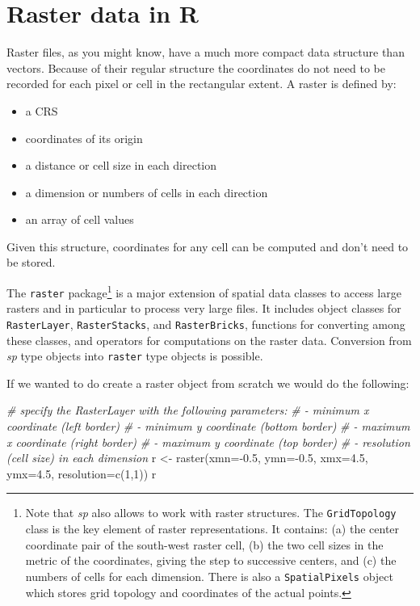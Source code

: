 \documentclass[
  11pt,
]{book}
\newenvironment{Shaded}{\begin{snugshade}}{\end{snugshade}}
\newcommand{\AttributeTok}[1]{\textcolor[rgb]{0.77,0.63,0.00}{#1}}
\newcommand{\CommentTok}[1]{\textcolor[rgb]{0.56,0.35,0.01}{\textit{#1}}}
\newcommand{\DecValTok}[1]{\textcolor[rgb]{0.00,0.00,0.81}{#1}}
\newcommand{\FloatTok}[1]{\textcolor[rgb]{0.00,0.00,0.81}{#1}}
\newcommand{\FunctionTok}[1]{\textcolor[rgb]{0.00,0.00,0.00}{#1}}
\newcommand{\NormalTok}[1]{#1}
\newcommand{\OtherTok}[1]{\textcolor[rgb]{0.56,0.35,0.01}{#1}}
\newcommand{\SpecialCharTok}[1]{\textcolor[rgb]{0.00,0.00,0.00}{#1}}
\providecommand{\tightlist}{%
  \setlength{\itemsep}{0pt}\setlength{\parskip}{0pt}}
\begin{document}
\hypertarget{raster-data-in-r}{%
\section{Raster data in R}\label{raster-data-in-r}}

Raster files, as you might know, have a much more compact data structure than vectors. Because of their regular structure the coordinates do not need to be recorded for each pixel or cell in the rectangular extent. A raster is defined by:

\begin{itemize}
\tightlist
\item
  a CRS
\item
  coordinates of its origin
\item
  a distance or cell size in each direction
\item
  a dimension or numbers of cells in each direction
\item
  an array of cell values
\end{itemize}

Given this structure, coordinates for any cell can be computed and don't need to be stored.

The \texttt{raster} package\footnote{Note that \emph{sp} also allows to work with raster structures. The \texttt{GridTopology} class is the key element of raster representations. It contains: (a) the center coordinate pair of the south-west raster cell, (b) the two cell sizes in the metric of the coordinates, giving the step to successive centers, and (c) the numbers of cells for each dimension. There is also a \texttt{SpatialPixels} object which stores grid topology and coordinates of the actual points.} is a major extension of spatial data classes to access large rasters and in particular to process very large files. It includes object classes for \texttt{RasterLayer}, \texttt{RasterStacks}, and \texttt{RasterBricks}, functions for converting among these classes, and operators for computations on the raster data. Conversion from \emph{sp} type objects into \texttt{raster} type objects is possible.

If we wanted to do create a raster object from scratch we would do the following:

\begin{Shaded}
\begin{Highlighting}[]
\CommentTok{\# specify the RasterLayer with the following parameters:}
\CommentTok{\# {-} minimum x coordinate (left border)}
\CommentTok{\# {-} minimum y coordinate (bottom border)}
\CommentTok{\# {-} maximum x coordinate (right border)}
\CommentTok{\# {-} maximum y coordinate (top border)}
\CommentTok{\# {-} resolution (cell size) in each dimension}
\NormalTok{r }\OtherTok{\textless{}{-}} \FunctionTok{raster}\NormalTok{(}\AttributeTok{xmn=}\SpecialCharTok{{-}}\FloatTok{0.5}\NormalTok{, }\AttributeTok{ymn=}\SpecialCharTok{{-}}\FloatTok{0.5}\NormalTok{, }\AttributeTok{xmx=}\FloatTok{4.5}\NormalTok{, }\AttributeTok{ymx=}\FloatTok{4.5}\NormalTok{, }\AttributeTok{resolution=}\FunctionTok{c}\NormalTok{(}\DecValTok{1}\NormalTok{,}\DecValTok{1}\NormalTok{))}
\NormalTok{r}
\end{Highlighting}
\end{Shaded}
\end{document}
